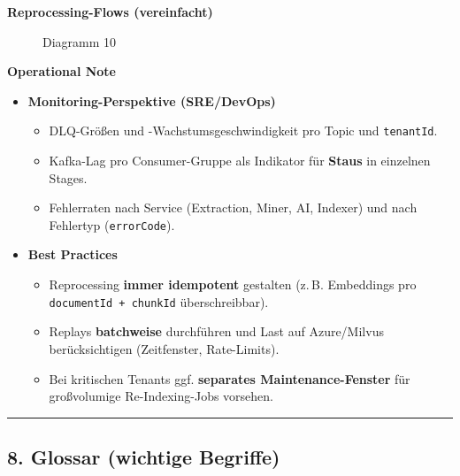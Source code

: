 \textbf{Reprocessing-Flows (vereinfacht)}

\begin{figure}
\centering
\pandocbounded{}
\caption{Diagramm 10}
\end{figure}

\textbf{Operational Note}

\begin{itemize}
\tightlist
\item
  \textbf{Monitoring-Perspektive (SRE/DevOps)}

  \begin{itemize}
  \tightlist
  \item
    DLQ-Größen und -Wachstumsgeschwindigkeit pro Topic und
    \texttt{tenantId}.\\
  \item
    Kafka-Lag pro Consumer-Gruppe als Indikator für \textbf{Staus} in
    einzelnen Stages.\\
  \item
    Fehlerraten nach Service (Extraction, Miner, AI, Indexer) und nach
    Fehlertyp (\texttt{errorCode}).
  \end{itemize}
\item
  \textbf{Best Practices}

  \begin{itemize}
  \tightlist
  \item
    Reprocessing \textbf{immer idempotent} gestalten (z.\,B. Embeddings
    pro \texttt{documentId\ +\ chunkId} überschreibbar).\\
  \item
    Replays \textbf{batchweise} durchführen und Last auf Azure/Milvus
    berücksichtigen (Zeitfenster, Rate-Limits).\\
  \item
    Bei kritischen Tenants ggf. \textbf{separates Maintenance-Fenster}
    für großvolumige Re-Indexing-Jobs vorsehen.
  \end{itemize}
\end{itemize}

\begin{center}\rule{0.5\linewidth}{0.5pt}\end{center}

\subsection{8. Glossar (wichtige
Begriffe)}\label{glossar-wichtige-begriffe}

